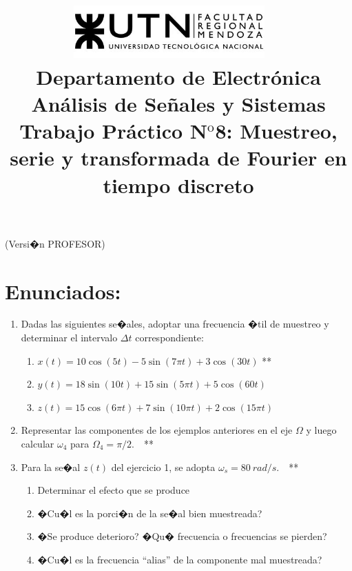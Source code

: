 \documentclass[10pt,a4paper]{article}
\title{
	\textsc{\includegraphics[width=0.55\textwidth]{logoUTN.jpg}} ~\\
	{\large Departamento de Electr\'onica}\\ 
	[0.1cm]
	{\Huge{An\'alisis de Se\~nales y Sistemas}} \\
	[0.25cm]
	{\Large{Trabajo Pr\'{a}ctico N$^{\text {o}}$8: Muestreo, serie y transformada de Fourier en tiempo discreto}		
	\\
	}}
\author{}
\date{}
\begin{document}
\maketitle
\begin{profesor}
	\hspace{6cm}(Versi�n PROFESOR)
\end{profesor}
\thispagestyle{fancy}

\section*{Enunciados:}
\label{sec:enun}

\begin{enumerate}
\subsubsection*{Muestreo}
\item {Dadas las siguientes se�ales, adoptar una frecuencia �til de muestreo y determinar el intervalo $\Delta t$ 
correspondiente:}
\begin{enumerate}
\item $x(t)=10\cos(5t)-5\sin(7\pi t)+3\cos(30t)$ **				
\item $y(t)=18\sin(10t)+15\sin(5\pi t)+5\cos(60t)$
\item $z(t)=15\cos(6\pi t)+7\sin(10\pi t)+2\cos(15\pi t)$			
\end{enumerate}	

\item {Representar las componentes de los ejemplos anteriores en el eje $\Omega$ y luego calcular $\omega_4$ para 
$\Omega_4=\pi/2$.~~**}

\item {Para la se�al $z(t)$ del ejercicio 1, se adopta $\omega_s=80~rad/s$}.~~**
\begin{enumerate}
	\item Determinar el efecto que se produce				
	\item �Cu�l es la porci�n de la se�al bien muestreada?
	\item �Se produce deterioro? �Qu� frecuencia o frecuencias se pierden?
	\item �Cu�l es la frecuencia ``alias'' de la componente mal muestreada?			
\end{enumerate}	


\end{enumerate}
\end{document}
